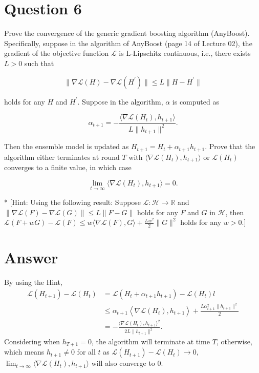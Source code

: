 \documentclass[
	12pt, %
]{fphw}
\begin{document}
\section*{Question 6}

\begin{problem}
	Prove the convergence of the generic gradient boosting algorithm (AnyBoost). Specifically, suppose in the algorithm of AnyBoost (page 14 of Lecture 02), the gradient of the objective function $\mathcal{L}$ is L-Lipschitz continuous, i.e., there exists $L>0$ such that

$$
\|\nabla\mathcal{L}(H)-\nabla\mathcal{L}(H^{\prime})\|\leq L\|H-H^{\prime}\|
$$

holds for any $H$ and $H^{\prime}$. Suppose in the algorithm, $\alpha$ is computed as

$$
\alpha_{t+1}=-\frac{\langle\nabla\mathcal{L}(H_{t}),h_{t+1}\rangle}{L\|h_{t+1}\|^{2}}.
$$

Then the ensemble model is updated as $H_{t+1}=H_t+\alpha_{t+1}h_{t+1}.$ Prove that the algorithm either terminates at round $T$ with $\langle\nabla\mathcal{L}(H_t),h_{t+1}\rangle$ or $\mathcal{L}(H_t)$ converges to a finite value, in which case

$$
\operatorname*{lim}_{t\to\infty}\langle\nabla\mathcal{L}(H_{t}),h_{t+1}\rangle=0.
$$

* [Hint: Using the following result: Suppose $\mathcal{L} : \mathcal{H} \to \mathbb{R} $ and $\|\nabla\mathcal{L} ( F) - \nabla\mathcal{L} ( G) \|\leq L\|F- G\|$ holds for any $F$ and $G$ in $\mathcal{H} $, then $\mathcal{L}(F+wG)-\mathcal{L}(F)\leq w\langle\nabla\mathcal{L}(F),G\rangle+\frac{Lw^2}2\|G\|^2$ holds for any $w>0.]$

\end{problem}
\section*{Answer}
By using the Hint, 
\begin{equation*}
	\begin{aligned}
		\mathcal{L}(H_{t+1})-\mathcal{L}(H_{t})& =\mathcal{L}(H_{t}+\alpha_{t+1}h_{t+1})-\mathcal{L}(H_{t})l  \\
		&\leq\alpha_{t+1}\left<\nabla \mathcal{L}(H_{t}),h_{t+1}\right>+\frac{L\alpha _{t+1}^{2}\|h_{t+1}\|^{2}}{2} \\
		& = -\frac{\langle\nabla \mathcal{L}(H_{t}),h_{t+1}\rangle^{2}}{2L\|h_{t+1}\|^{2}}.
	\end{aligned}
\end{equation*}
Considering when $h_{T+1}=0$, the algorithm will terminate at time $T$, otherwise, which means $h_{t+1}\neq 0$ for all $t$
 as $\mathcal{L}(H_{t+1})-\mathcal{L}(H_{t}) \rightarrow 0$,  $\operatorname*{lim}_{t\to\infty}\langle\nabla\mathcal{L}(H_{t}),h_{t+1}\rangle$ will also converge to 0.
\end{document}
